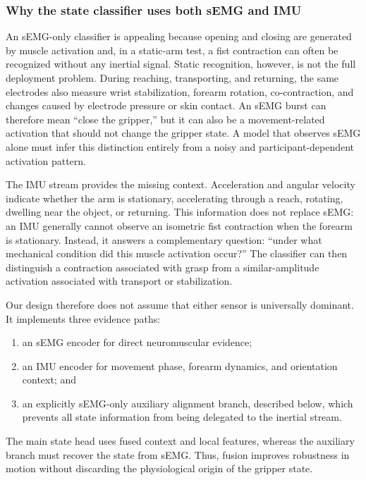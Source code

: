 \subsubsection{Why the state classifier uses both sEMG and IMU}

An sEMG-only classifier is appealing because opening and closing are generated
by muscle activation and, in a static-arm test, a fist contraction can often be
recognized without any inertial signal.  Static recognition, however, is not
the full deployment problem.  During reaching, transporting, and returning,
the same electrodes also measure wrist stabilization, forearm rotation,
co-contraction, and changes caused by electrode pressure or skin contact.  An
sEMG burst can therefore mean ``close the gripper,'' but it can also be a
movement-related activation that should not change the gripper state.  A model
that observes sEMG alone must infer this distinction entirely from a noisy and
participant-dependent activation pattern.

The IMU stream provides the missing context.  Acceleration and angular
velocity indicate whether the arm is stationary, accelerating through a reach,
rotating, dwelling near the object, or returning.  This information does not
replace sEMG: an IMU generally cannot observe an isometric fist contraction
when the forearm is stationary.  Instead, it answers a complementary question:
``under what mechanical condition did this muscle activation occur?''  The
classifier can then distinguish a contraction associated with grasp from a
similar-amplitude activation associated with transport or stabilization.

Our design therefore does not assume that either sensor is universally
dominant.  It implements three evidence paths:
\begin{enumerate}
    \item an sEMG encoder for direct neuromuscular evidence;
    \item an IMU encoder for movement phase, forearm dynamics, and orientation
          context; and
    \item an explicitly sEMG-only auxiliary alignment branch, described below,
          which prevents all state information from being delegated to the
          inertial stream.
\end{enumerate}
The main state head uses fused context and local features, whereas the auxiliary
branch must recover the state from sEMG.  Thus, fusion improves robustness in
motion without discarding the physiological origin of the gripper state.

